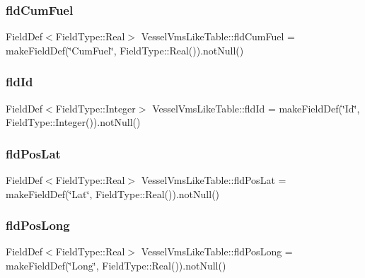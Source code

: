 \mbox{\label{class_vessel_vms_like_table_ad06a099f3e8d2fec045bcd990fb81650}} 
\subsubsection{\texorpdfstring{fldCumFuel}{fldCumFuel}}
{\footnotesize\ttfamily Field\+Def$<$Field\+Type\+::\+Real$>$ Vessel\+Vms\+Like\+Table\+::fld\+Cum\+Fuel = make\+Field\+Def(\char`\"{}Cum\+Fuel\char`\"{}, Field\+Type\+::\+Real()).not\+Null()}

\mbox{\label{class_vessel_vms_like_table_a87f903e5516aaccb43c1ea6e90c0a923}} 
\subsubsection{\texorpdfstring{fldId}{fldId}}
{\footnotesize\ttfamily Field\+Def$<$Field\+Type\+::\+Integer$>$ Vessel\+Vms\+Like\+Table\+::fld\+Id = make\+Field\+Def(\char`\"{}Id\char`\"{}, Field\+Type\+::\+Integer()).not\+Null()}

\mbox{\label{class_vessel_vms_like_table_a115196d529d843c8f9d09cb46273ee49}} 
\subsubsection{\texorpdfstring{fldPosLat}{fldPosLat}}
{\footnotesize\ttfamily Field\+Def$<$Field\+Type\+::\+Real$>$ Vessel\+Vms\+Like\+Table\+::fld\+Pos\+Lat = make\+Field\+Def(\char`\"{}Lat\char`\"{}, Field\+Type\+::\+Real()).not\+Null()}

\mbox{\label{class_vessel_vms_like_table_a07f5fde6d95b76f05b95fa9f462a69d5}} 
\subsubsection{\texorpdfstring{fldPosLong}{fldPosLong}}
{\footnotesize\ttfamily Field\+Def$<$Field\+Type\+::\+Real$>$ Vessel\+Vms\+Like\+Table\+::fld\+Pos\+Long = make\+Field\+Def(\char`\"{}Long\char`\"{}, Field\+Type\+::\+Real()).not\+Null()}

